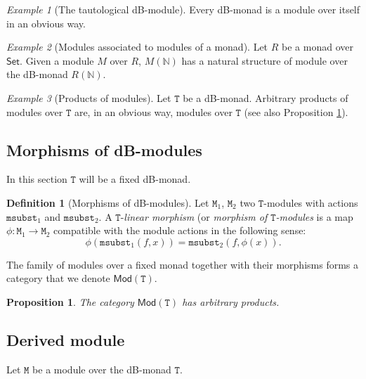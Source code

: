 \documentclass[a4paper,twoside,12pt]{article}
\newtheorem{proposition}{Proposition}
\theoremstyle{definition}
\newtheorem{definition}{Definition}
\theoremstyle{remark}
\theoremstyle{example}
\newtheorem{example}{Example}
\newcommand{\NN}{\mathbb{N}}
\newcommand{\TT}{\mathtt{T}}
\newcommand{\MM}{\mathtt{M}}
\newcommand{\msubst}{\mathtt{msubst}}
\begin{document}
\begin{example}[The tautological dB-module]
  Every dB-monad is a module over itself in an obvious way.
\end{example}

\begin{example}[Modules associated to modules of a monad]
  Let $R$ be a monad over $\mathsf{Set}$.  Given a module $M$ over
  $R$, $M(\NN)$ has a natural structure of module over the dB-monad
  $R(\NN)$.
\end{example}

\begin{example}[Products of modules]
  Let $\TT$ be a dB-monad.  Arbitrary products of modules over $\TT$
  are, in an obvious way, modules over $\TT$ (see also Proposition
  \ref{prop:modules-product}).
\end{example}

\subsection{Morphisms of dB-modules}
\label{sec:morphisms-db-modules}

In this section $\TT$ will be a fixed dB-monad.

\begin{definition}[Morphisms of dB-modules]
  Let $\MM_1$, $\MM_2$ two $\TT$-modules with actions $\msubst_1$ and
  $\msubst_2$.  A $\TT$-\emph{linear morphism} (or \emph{morphism of
    $\TT$-modules} is a map $\phi\colon \MM_1 \to \MM_2$ compatible
  with the module actions in the following sense:
  \begin{equation*}
    \phi(\msubst_1(f,x)) = \msubst_2(f,\phi(x)).
  \end{equation*}
\end{definition}

The family of modules over a fixed monad together with their morphisms
forms a category that we denote $\mathsf{Mod}(\TT)$.

\begin{proposition}
  \label{prop:modules-product}
  The category $\mathsf{Mod}(\TT)$ has arbitrary products.
\end{proposition}

\subsection{Derived module}
\label{sec:derived-module}

Let $\MM$ be a module over the dB-monad $\TT$.
\end{document}
